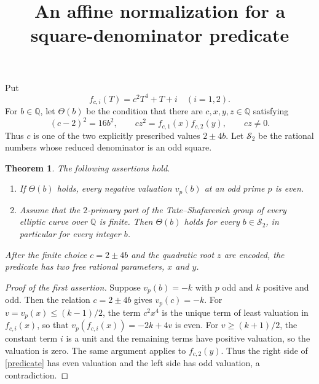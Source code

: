 \documentclass[11pt]{article}
\title{An affine normalization for a square-denominator predicate}
\author{}
\date{}
\newtheorem{theorem}{Theorem}
\newcommand{\Q}{\mathbb Q}
\begin{document}
\maketitle

Put
\[
 f_{c,i}(T)=c^2T^4+T+i\quad(i=1,2).
\]
For $b\in\Q$, let $\Theta(b)$ be the condition that there are
$c,x,y,z\in\Q$ satisfying
\begin{equation}\label{predicate}
 (c-2)^2=16b^2,\qquad
 cz^2=f_{c,1}(x)f_{c,2}(y),\qquad cz\ne0.
\end{equation}
Thus $c$ is one of the two explicitly prescribed values $2\pm4b$.
Let $\mathcal S_2$ be the rational numbers whose reduced denominator is
an odd square.

\begin{theorem}\label{main}
The following assertions hold.
\begin{enumerate}
\item If $\Theta(b)$ holds, every negative valuation $v_p(b)$ at an odd
prime $p$ is even.
\item Assume that the $2$-primary part of the Tate--Shafarevich group of
every elliptic curve over $\Q$ is finite. Then $\Theta(b)$ holds for every
$b\in\mathcal S_2$, in particular for every integer $b$.
\end{enumerate}
After the finite choice $c=2\pm4b$ and the quadratic root $z$ are encoded,
the predicate has two free rational parameters, $x$ and $y$.
\end{theorem}

\begin{proof}[Proof of the first assertion]
Suppose $v_p(b)=-k$ with $p$ odd and $k$ positive and odd. Then the relation $c=2\pm4b$ gives $v_p(c)=-k$. For $v=v_p(x)\le(k-1)/2$, the term $c^2x^4$
is the unique term of least valuation in $f_{c,i}(x)$, so that
$v_p(f_{c,i}(x))=-2k+4v$ is even. For $v\ge(k+1)/2$, the constant term
$i$ is a unit and the remaining terms have positive valuation, so the
valuation is zero. The same argument applies to $f_{c,2}(y)$. Thus the
right side of \eqref{predicate} has even valuation and the left side
has odd valuation, a contradiction.
\end{proof}
\end{document}
